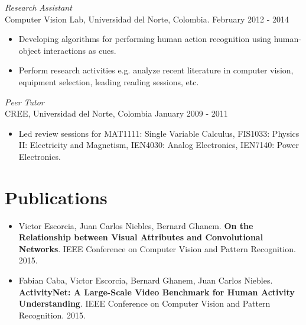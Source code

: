 \documentclass[margin]{res}
\begin{document}
\begin{resume}
 \textit{Research Assistant}\\
 Computer Vision Lab, Universidad del Norte, Colombia. \hfill February 2012 - 2014 \\
 \begin{itemize} \itemsep -2pt %
  \item Developing algorithms for performing human action recognition using
 human-object interactions as cues.
 \item Perform research activities e.g. analyze recent literature in computer
       vision, equipment selection, leading reading sessions, etc.
 \end{itemize}
 
 \textit{Peer Tutor}\\
 CREE, Universidad del Norte, Colombia \hfill January  2009 - 2011 \\
 \begin{itemize} \itemsep -2pt %
  \item Led review sessions for MAT1111: Single Variable Calculus, FIS1033:
 Physics II: Electricity and Magnetism, IEN4030: Analog Electronics,
 IEN7140: Power Electronics.
  \end{itemize}



\section{Publications} 
\begin{itemize} \itemsep -2pt %

\item Victor Escorcia, Juan Carlos Niebles, Bernard Ghanem. \textbf{On the
Relationship between Visual Attributes and Convolutional Networks}. IEEE
Conference on Computer Vision and Pattern Recognition. 2015.
\smallskip

\item Fabian Caba, Victor Escorcia, Bernard Ghanem, Juan Carlos Niebles.
\textbf{ActivityNet: A Large-Scale Video Benchmark for Human Activity
Understanding}. IEEE Conference on Computer Vision and Pattern Recognition.
2015.
\smallskip


\end{itemize}
\end{resume}
\end{document}
